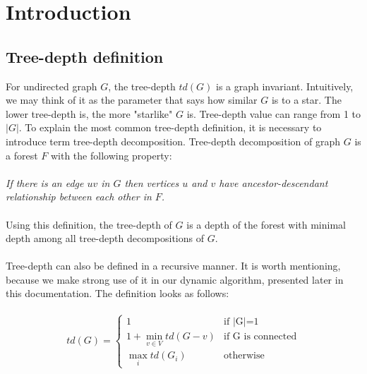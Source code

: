 \section{Introduction}
\subsection{Tree-depth definition}
For undirected graph $G$, the tree-depth $td(G)$ is a graph invariant. Intuitively, we may think of it as the parameter that says how similar $G$ is to a star. The lower tree-depth is, the more "starlike" $G$ is.
Tree-depth value can range from 1 to $|G|$.
To explain the most common tree-depth definition, it is necessary to introduce term tree-depth decomposition. Tree-depth decomposition of graph $G$ is a forest $F$ with the following property:\\\\
\emph{If there is an edge $uv$ in $G$ then vertices $u$ and $v$ have ancestor-descendant relationship between each other in $F$.}\\\\
Using this definition, the tree-depth of $G$ is a depth of the forest with minimal depth among all tree-depth decompositions of $G$.\\\\
Tree-depth can also be defined in a recursive manner. It is worth mentioning, because we make strong use of it in our dynamic algorithm, presented later in this documentation. The definition looks as follows:\\\\
\begin{equation}
td(G) =
\begin{cases}
1 & \text{if $|$G$|$=1}\\
1+\min_{v \in V} td(G-v) & \text{if G is connected}\\
\max_{i} td(G_{i})  & \text{otherwise}
\end{cases}\label{td_def}
\end{equation}
\\
